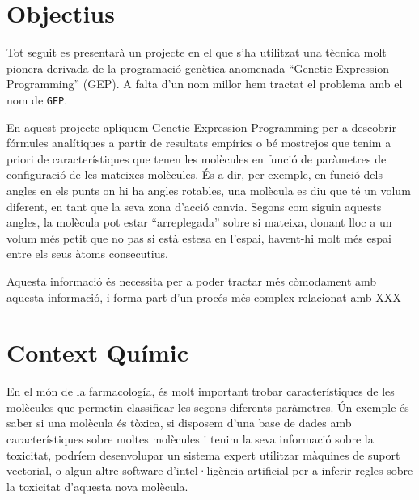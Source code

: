 

%

\section{Objectius} %
\label{sec:Introduccio}
Tot seguit es presentarà un projecte en el que s'ha utilitzat una tècnica
molt pionera derivada de la programació genètica anomenada ``Genetic
Expression Programming'' (GEP).  A falta d'un nom millor hem tractat el
problema amb el nom de \texttt{GEP}.

En aquest projecte apliquem Genetic Expression Programming per a descobrir
fórmules analítiques a partir de resultats empírics o bé mostrejos que tenim
a priori de característiques que tenen les molècules en funció de paràmetres
de configuració de les mateixes molècules.  És a dir, per exemple, en funció
dels angles en els punts on hi ha angles rotables, una molècula es diu que
té un volum diferent, en tant que la seva zona d'acció canvia.  Segons com
siguin aquests angles, la molècula pot estar ``arreplegada'' sobre si
mateixa, donant lloc a un volum més petit que no pas si està estesa en
l'espai, havent-hi molt més espai entre els seus àtoms consecutius.

Aquesta informació és necessita per a poder tractar més còmodament amb
aquesta informació, i forma part d'un procés més complex relacionat amb XXX


\section{Context Químic} %
\label{sec:Context Quimic}

En el món de la farmacología, és molt important trobar característiques de les
molècules que permetin classificar-les segons diferents paràmetres.  Ún exemple
és saber si una molècula és tòxica, si disposem d'una base de dades amb
característiques sobre moltes molècules i tenim la seva informació sobre la
toxicitat, podríem desenvolupar un sistema expert utilitzar màquines de suport
vectorial, o algun altre software d'intel·ligència artificial per a inferir
regles sobre la toxicitat d'aquesta nova molècula.

